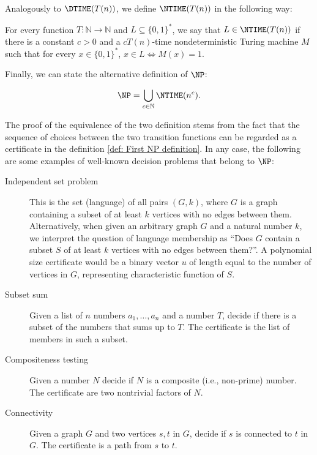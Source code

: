 \documentclass[12pt,a4paper,titlepage,openany]{report}
\begin{document}
Analogously to $\DTIME(T(n))$, we define $\NTIME(T(n))$ in the following way:

\begin{definition}
	For every function $T: \mathbb N \to \mathbb N$ and $L \subseteq \{ 0, 1 \}^*$, we say that $L \in \NTIME(T(n))$ if there is a constant $c > 0$ and a $cT(n)$-time nondeterministic Turing machine $M$ such that for every $x\in \{0, 1\}^*$, $x\in L \Leftrightarrow M(x) = 1$.
\end{definition}

Finally, we can state the alternative definition of $\NP$:

\begin{definition}
	\begin{align}
	\NP = \bigcup_{c \in \mathbb N} \NTIME(n^c).
	\end{align}
\end{definition}

The proof of the equivalence of the two definition stems from the fact that the sequence of choices between the two transition functions can be regarded as a certificate in the definition \ref{def: First NP definition}.
In any case, the following are some examples of well-known decision problems that belong to $\NP$:
\begin{description}
	\item[Independent set problem] This is the set (language) of all pairs $(G, k)$, where $G$ is a graph containing a subset of at least $k$ vertices with no edges between them. Alternatively, when given an arbitrary graph $G$ and a natural number $k$, we interpret the question of language membership as ``Does $G$ contain a subset $S$ of at least $k$ vertices with no edges between them?''. A polynomial size certificate would be a binary vector $u$ of length equal to the number of vertices in $G$, representing characteristic function of $S$.
	\item[Subset sum] Given a list of $n$ numbers $a_1,\dots,a_n$ and a number $T$, decide if there
	is a subset of the numbers that sums up to $T$. The certificate is the list of members
	in such a subset.
	\item[Compositeness testing] Given a number $N$ decide if $N$ is a composite (i.e., non-prime)
	number. The certificate are two nontrivial factors of $N$.
	\item[Connectivity] Given a graph $G$ and two vertices $s, t$ in $G$, decide if $s$ is connected to
	$t$ in $G$. The certificate is a path from $s$ to $t$.
\end{description}
\end{document}
